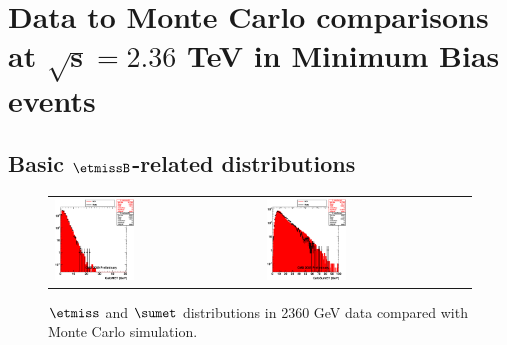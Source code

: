 \section[Data to Monte Carlo comparisons at $\sqrt{s}=2.36$ TeV in
  Minimum Bias events]{Data to Monte Carlo comparisons at $\boldsymbol{\sqrt{s}=2.36}$ TeV in
  Minimum Bias events}
\label{sc:DataVsMCMB2360}

\subsection[Basic $\etmiss$-related distributions]{Basic $\etmissB$-related distributions}
\begin{figure}[h!]
 \centering
 \begin{tabular}{ll}
  \includegraphics[width=0.40\textwidth]{plots_DataVsMC_MB_2360GeV/h_calometPt.eps} &
  \includegraphics[width=0.40\textwidth]{plots_DataVsMC_MB_2360GeV/h_caloSumet.eps} \\
 \end{tabular}
 \caption{$\etmiss$ and $\sumet$ distributions in 2360 GeV data compared with Monte Carlo simulation.
          \label{fig:DataVsMC_MB_2360_1}}
\end{figure}

